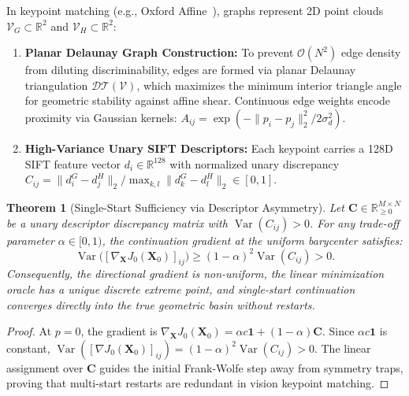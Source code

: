 \documentclass[conference]{IEEEtran}
\newtheorem{theorem}{Theorem}
\begin{document}
In keypoint matching (e.g., Oxford Affine~\cite{mikolajczyk2005comparison}), graphs represent 2D point clouds $\mathcal{V}_G \subset \mathbb{R}^2$ and $\mathcal{V}_H \subset \mathbb{R}^2$:
\begin{enumerate}
    \item \textbf{Planar Delaunay Graph Construction:} To prevent $\mathcal{O}(N^2)$ edge density from diluting discriminability, edges are formed via planar Delaunay triangulation $\mathcal{DT}(\mathcal{V})$, which maximizes the minimum interior triangle angle for geometric stability against affine shear. Continuous edge weights encode proximity via Gaussian kernels: $A_{ij} = \exp(-\|p_i - p_j\|_2^2 / 2\sigma_d^2)$.
    \item \textbf{High-Variance Unary SIFT Descriptors:} Each keypoint carries a 128D SIFT feature vector $d_i \in \mathbb{R}^{128}$ with normalized unary discrepancy $C_{ij} = \|d_i^G - d_j^H\|_2 / \max_{k, l} \|d_k^G - d_l^H\|_2 \in [0, 1]$.
\end{enumerate}

\begin{theorem}[Single-Start Sufficiency via Descriptor Asymmetry]
\label{thm:image_single_start}
Let $\mathbf{C} \in \mathbb{R}_{\geq 0}^{M \times N}$ be a unary descriptor discrepancy matrix with $\operatorname{Var}(C_{ij}) > 0$. For any trade-off parameter $\alpha \in [0, 1)$, the continuation gradient at the uniform barycenter satisfies:
\begin{equation}
\operatorname{Var}\big( [\nabla_{\mathbf{X}} J_0(\mathbf{X}_0)]_{ij} \big) \geq (1 - \alpha)^2 \operatorname{Var}(C_{ij}) > 0.
\label{eq:gradient_variance}
\end{equation}
Consequently, the directional gradient is non-uniform, the linear minimization oracle has a unique discrete extreme point, and single-start continuation converges directly into the true geometric basin without restarts.
\end{theorem}

\begin{proof}
At $p=0$, the gradient is $\nabla_{\mathbf{X}} J_0(\mathbf{X}_0) = \alpha c \mathbf{1} + (1 - \alpha)\mathbf{C}$. Since $\alpha c \mathbf{1}$ is constant, $\operatorname{Var}([\nabla J_0(\mathbf{X}_0)]_{ij}) = (1 - \alpha)^2 \operatorname{Var}(C_{ij}) > 0$. The linear assignment over $\mathbf{C}$ guides the initial Frank-Wolfe step away from symmetry traps, proving that multi-start restarts are redundant in vision keypoint matching.
\end{proof}
\end{document}

